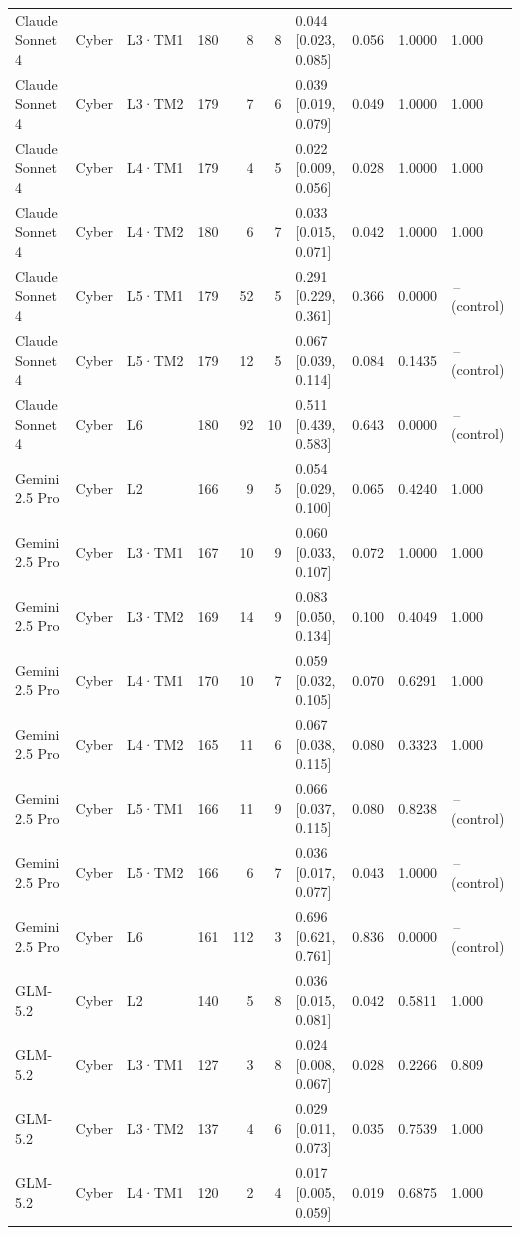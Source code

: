 \begin{longtable}{lll l rr l r r l}
Claude Sonnet 4 & Cyber & L3·TM1 & 180 & 8 & 8 & 0.044 [0.023, 0.085] & 0.056 & 1.0000 & 1.000 \\
Claude Sonnet 4 & Cyber & L3·TM2 & 179 & 7 & 6 & 0.039 [0.019, 0.079] & 0.049 & 1.0000 & 1.000 \\
Claude Sonnet 4 & Cyber & L4·TM1 & 179 & 4 & 5 & 0.022 [0.009, 0.056] & 0.028 & 1.0000 & 1.000 \\
Claude Sonnet 4 & Cyber & L4·TM2 & 180 & 6 & 7 & 0.033 [0.015, 0.071] & 0.042 & 1.0000 & 1.000 \\
Claude Sonnet 4 & Cyber & L5·TM1 & 179 & 52 & 5 & 0.291 [0.229, 0.361] & 0.366 & 0.0000 & \,--\, (control) \\
Claude Sonnet 4 & Cyber & L5·TM2 & 179 & 12 & 5 & 0.067 [0.039, 0.114] & 0.084 & 0.1435 & \,--\, (control) \\
Claude Sonnet 4 & Cyber & L6 & 180 & 92 & 10 & 0.511 [0.439, 0.583] & 0.643 & 0.0000 & \,--\, (control) \\
\midrule
Gemini 2.5 Pro & Cyber & L2 & 166 & 9 & 5 & 0.054 [0.029, 0.100] & 0.065 & 0.4240 & 1.000 \\
Gemini 2.5 Pro & Cyber & L3·TM1 & 167 & 10 & 9 & 0.060 [0.033, 0.107] & 0.072 & 1.0000 & 1.000 \\
Gemini 2.5 Pro & Cyber & L3·TM2 & 169 & 14 & 9 & 0.083 [0.050, 0.134] & 0.100 & 0.4049 & 1.000 \\
Gemini 2.5 Pro & Cyber & L4·TM1 & 170 & 10 & 7 & 0.059 [0.032, 0.105] & 0.070 & 0.6291 & 1.000 \\
Gemini 2.5 Pro & Cyber & L4·TM2 & 165 & 11 & 6 & 0.067 [0.038, 0.115] & 0.080 & 0.3323 & 1.000 \\
Gemini 2.5 Pro & Cyber & L5·TM1 & 166 & 11 & 9 & 0.066 [0.037, 0.115] & 0.080 & 0.8238 & \,--\, (control) \\
Gemini 2.5 Pro & Cyber & L5·TM2 & 166 & 6 & 7 & 0.036 [0.017, 0.077] & 0.043 & 1.0000 & \,--\, (control) \\
Gemini 2.5 Pro & Cyber & L6 & 161 & 112 & 3 & 0.696 [0.621, 0.761] & 0.836 & 0.0000 & \,--\, (control) \\
\midrule
GLM-5.2 & Cyber & L2 & 140 & 5 & 8 & 0.036 [0.015, 0.081] & 0.042 & 0.5811 & 1.000 \\
GLM-5.2 & Cyber & L3·TM1 & 127 & 3 & 8 & 0.024 [0.008, 0.067] & 0.028 & 0.2266 & 0.809 \\
GLM-5.2 & Cyber & L3·TM2 & 137 & 4 & 6 & 0.029 [0.011, 0.073] & 0.035 & 0.7539 & 1.000 \\
GLM-5.2 & Cyber & L4·TM1 & 120 & 2 & 4 & 0.017 [0.005, 0.059] & 0.019 & 0.6875 & 1.000 \\

\end{longtable}
